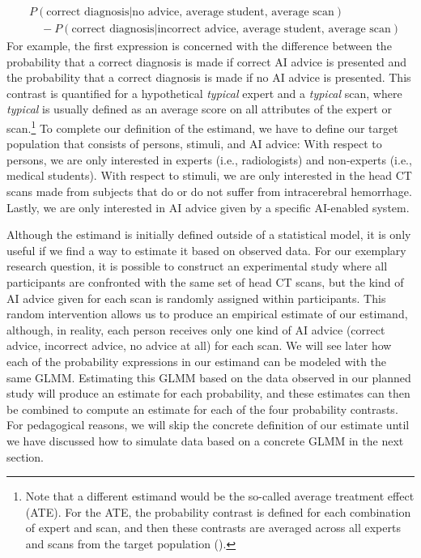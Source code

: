 \documentclass[
  man,
  floatsintext,
  longtable,
  a4paper,
  nolmodern,
  notxfonts,
  notimes,
  colorlinks=true,linkcolor=blue,citecolor=blue,urlcolor=blue]{apa7}
\begin{document}
\[
\begin{aligned}
& P(\text{correct diagnosis} | \text{no advice, average student, average scan}) \\
& \quad - P(\text{correct diagnosis} | \text{incorrect advice, average student, average scan})
\end{aligned}
\] For example, the first expression is concerned with the difference
between the probability that a correct diagnosis is made if correct AI
advice is presented and the probability that a correct diagnosis is made
if no AI advice is presented. This contrast is quantified for a
hypothetical \emph{typical} expert and a \emph{typical} scan, where
\emph{typical} is usually defined as an average score on all attributes
of the expert or scan.\footnote{Note that a different estimand would be
  the so-called average treatment effect (ATE). For the ATE, the
  probability contrast is defined for each combination of expert and
  scan, and then these contrasts are averaged across all experts and
  scans from the target population
  ().}
To complete our definition of the estimand, we have to define our target
population that consists of persons, stimuli, and AI advice: With
respect to persons, we are only interested in experts (i.e.,
radiologists) and non-experts (i.e., medical students). With respect to
stimuli, we are only interested in the head CT scans made from subjects
that do or do not suffer from intracerebral hemorrhage. Lastly, we are
only interested in AI advice given by a specific AI-enabled system.

Although the estimand is initially defined outside of a statistical
model, it is only useful if we find a way to estimate it based on
observed data. For our exemplary research question, it is possible to
construct an experimental study where all participants are confronted
with the same set of head CT scans, but the kind of AI advice given for
each scan is randomly assigned within participants. This random
intervention allows us to produce an empirical estimate of our estimand,
although, in reality, each person receives only one kind of AI advice
(correct advice, incorrect advice, no advice at all) for each scan. We
will see later how each of the probability expressions in our estimand
can be modeled with the same GLMM. Estimating this GLMM based on the
data observed in our planned study will produce an estimate for each
probability, and these estimates can then be combined to compute an
estimate for each of the four probability contrasts. For pedagogical
reasons, we will skip the concrete definition of our estimate until we
have discussed how to simulate data based on a concrete GLMM in the next
section.
\end{document}
